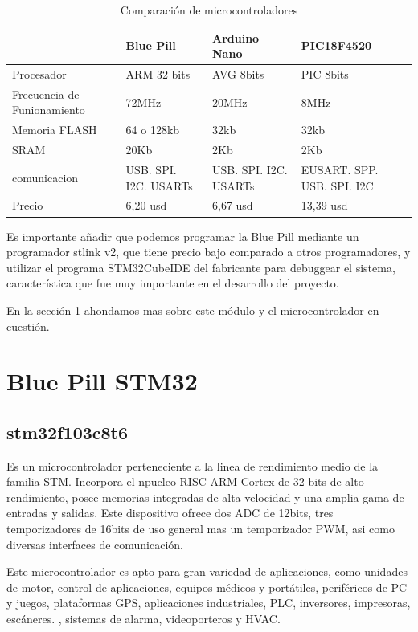 \begin{table}[t]
    \begin{center}
        \begin{tabular}{ | m{3cm} | m{3cm} | m{3cm} | m{3cm} | }
        \hline  & Blue Pill & Arduino Nano & PIC18F4520  \\ \hline
        Procesador & ARM 32 bits & AVG 8bits & PIC 8bits \\ \hline
        Frecuencia de Funionamiento & 72MHz &20MHz & 8MHz \\ \hline
        Memoria FLASH & 64 o 128kb & 32kb & 32kb\\ \hline
        SRAM & 20Kb & 2Kb & 2Kb \\ \hline
        comunicacion & USB. SPI. I2C. USARTs &  USB. SPI. I2C. USARTs & EUSART. SPP. USB. SPI. I2C\\ \hline
        Precio & 6,20 usd &  6,67 usd & 13,39 usd\\ \hline
        
        \end{tabular}
        \caption{Comparación de microcontroladores}
        \label{tab:uC}   
    \end{center}
\end{table}

Es importante añadir que podemos programar la Blue Pill mediante un programador stlink v2, que tiene precio bajo comparado a otros programadores, y
utilizar el programa STM32CubeIDE del fabricante para debuggear el sistema, característica que fue muy importante en el desarrollo del proyecto.\par
En la sección \ref{cap:stm32} ahondamos mas sobre este módulo y el microcontrolador en cuestión. 

\section{Blue Pill STM32} \label{cap:stm32}
\subsection{stm32f103c8t6}

Es un microcontrolador perteneciente a la linea de rendimiento medio de la familia STM. Incorpora el npucleo RISC ARM Cortex de 32 bits de alto rendimiento,
posee memorias integradas de alta velocidad y una amplia gama de entradas y salidas. Este dispositivo ofrece dos ADC de 12bits, tres temporizadores de 16bits
de uso general mas un temporizador PWM, asi como diversas interfaces de comunicación.\par 
Este microcontrolador es apto para gran variedad de aplicaciones, como unidades de motor, control de aplicaciones, equipos médicos y portátiles, periféricos
de PC y juegos, plataformas GPS, aplicaciones industriales, PLC, inversores, impresoras, escáneres. , sistemas de alarma, videoporteros y HVAC.

